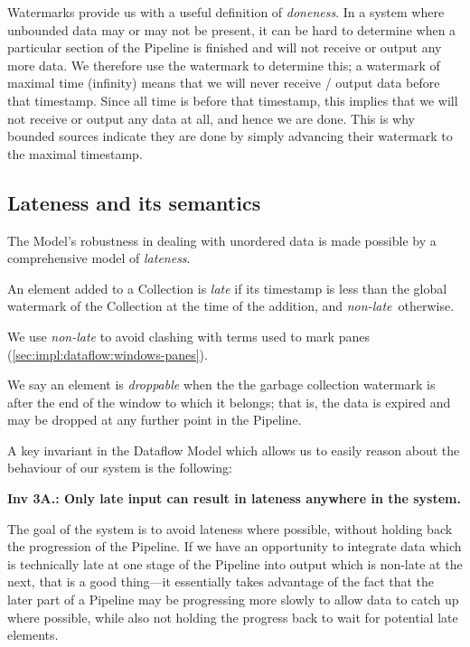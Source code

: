 Watermarks provide us with a useful definition of \emph{doneness}.
In a system where unbounded data may or may not be present, it can be hard to determine when a particular section of the Pipeline is finished and will not receive or output any more data.
We therefore use the watermark to determine this; a watermark of maximal time (infinity) means that we will never receive / output data before that timestamp.
Since all time is before that timestamp, this implies that we will not receive or output any data at all, and hence we are done.
This is why bounded sources indicate they are done by simply advancing their watermark to the maximal timestamp.

\subsection{Lateness and its semantics}\label{sec:impl:dataflow:lateness}

The Model's robustness in dealing with unordered data is made possible by a comprehensive model of \emph{lateness}.

An element added to a Collection is \emph{late} if its timestamp is less than the global watermark of the Collection at the time of the addition, and \emph{non-late}\footnotemark\ otherwise.

\footnotetext
{
We use \emph{non-late} to avoid clashing with terms used to mark panes (\cref{sec:impl:dataflow:windows-panes}).
}

We say an element is \emph{droppable} when the the garbage collection watermark is after the end of the window to which it belongs; that is, the data is expired and may be dropped at any further point in the Pipeline.

A key invariant in the Dataflow Model which allows us to easily reason about the behaviour of our system is the following:


\textbf{Inv 3A.: Only late input can result in lateness anywhere in the system.}

The goal of the system is to avoid lateness where possible, without holding back the progression of the Pipeline.
If we have an opportunity to integrate data which is technically late at one stage of the Pipeline into output which is non-late at the next, that is a good thing---it essentially takes advantage of the fact that the later part of a Pipeline may be progressing more slowly to allow data to catch up where possible, while also not holding the progress back to wait for potential late elements.

